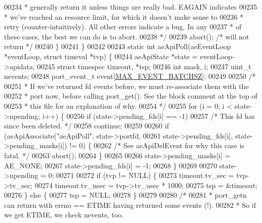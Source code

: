 \begin{DoxyCode}
{{{{{{{{00234 \textcolor{comment}{         * generally return it unless things are really bad.  EAGAIN indicates}
00235 \textcolor{comment}{         * we've reached an resource limit, for which it doesn't make sense to}
00236 \textcolor{comment}{         * retry (counter-intuitively).  All other errors indicate a bug.  In any}
00237 \textcolor{comment}{         * of these cases, the best we can do is to abort.}
00238 \textcolor{comment}{         */}
00239         abort(); \textcolor{comment}{/* will not return */}
00240     \}
00241 \}
00242 
00243 \textcolor{keyword}{static} \textcolor{keywordtype}{int} aeApiPoll(aeEventLoop *eventLoop, \textcolor{keyword}{struct} timeval *tvp) \{
00244     aeApiState *state = eventLoop->apidata;
00245     \textcolor{keyword}{struct} timespec timeout, *tsp;
00246     \textcolor{keywordtype}{int} mask, i;
00247     uint\_t nevents;
00248     port\_event\_t event[\hyperlink{ae__evport_8c_ab9854fb7f580a9077208ed70f45c8f15}{MAX\_EVENT\_BATCHSZ}];
00249 
00250     \textcolor{comment}{/*}
00251 \textcolor{comment}{     * If we've returned fd events before, we must re-associate them with the}
00252 \textcolor{comment}{     * port now, before calling port\_get().  See the block comment at the top of}
00253 \textcolor{comment}{     * this file for an explanation of why.}
00254 \textcolor{comment}{     */}
00255     \textcolor{keywordflow}{for} (i = 0; i < state->npending; i++) \{
00256         \textcolor{keywordflow}{if} (state->pending\_fds[i] == -1)
00257             \textcolor{comment}{/* This fd has since been deleted. */}
00258             \textcolor{keywordflow}{continue};
00259 
00260         \textcolor{keywordflow}{if} (aeApiAssociate(\textcolor{stringliteral}{"aeApiPoll"}, state->portfd,
00261             state->pending\_fds[i], state->pending\_masks[i]) != 0) \{
00262             \textcolor{comment}{/* See aeApiDelEvent for why this case is fatal. */}
00263             abort();
00264         \}
00265 
00266         state->pending\_masks[i] = AE\_NONE;
00267         state->pending\_fds[i] = -1;
00268     \}
00269 
00270     state->npending = 0;
00271 
00272     \textcolor{keywordflow}{if} (tvp != NULL) \{
00273         timeout.tv\_sec = tvp->tv\_sec;
00274         timeout.tv\_nsec = tvp->tv\_usec * 1000;
00275         tsp = &timeout;
00276     \} \textcolor{keywordflow}{else} \{
00277         tsp = NULL;
00278     \}
00279 
00280     \textcolor{comment}{/*}
00281 \textcolor{comment}{     * port\_getn can return with errno == ETIME having returned some events (!).}
00282 \textcolor{comment}{     * So if we get ETIME, we check nevents, too.}
}}}}}}}}
\end{DoxyCode}
